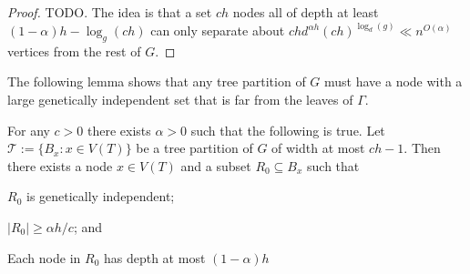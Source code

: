 \documentclass{patmorin}
\begin{document}
\begin{proof}
  TODO. The idea is that a set $ch$ nodes all of depth at least $(1-\alpha)h-\log_g(ch)$ can only separate about $chd^{\alpha h}(ch)^{\log_d(g)}\ll n^{O(\alpha)}$ vertices from the rest of $G$.
\end{proof}


The following lemma shows that any tree partition of $G$ must have a node with a large genetically independent set that is far from the leaves of $\Gamma$.

\begin{lem}\label{startup}
  For any $c>0$ there exists $\alpha>0$ such that the following is true.
  Let $\mathcal{T}:=\{B_x:x\in V(T)\}$ be a tree partition of $G$ of width at most $ch-1$.  Then there exists a node $x\in V(T)$ and a subset $R_0\subseteq B_x$ such that
  \begin{compactenum}[(i)]
    \item $R_0$ is genetically independent;
    \item $|R_0|\ge \alpha h/c$; and
    \item Each node in $R_0$ has depth at most $(1-\alpha)h$ 
  \end{compactenum}
\end{lem}

\end{document}
